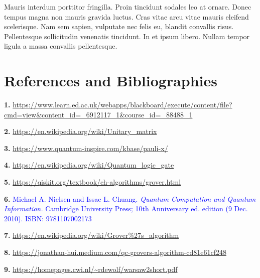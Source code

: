 \documentclass{article}
\begin{document}
Mauris interdum porttitor fringilla. Proin tincidunt sodales leo at ornare. Donec tempus magna non mauris gravida luctus. Cras vitae arcu vitae mauris eleifend scelerisque. Nam sem sapien, vulputate nec felis eu, blandit convallis risus. Pellentesque sollicitudin venenatis tincidunt. In et ipsum libero. Nullam tempor ligula a massa convallis pellentesque.



\section{References and Bibliographies}
\vspace{5mm}

\textbf{1.} \hypertarget{1}{\url{https://www.learn.ed.ac.uk/webapps/blackboard/execute/content/file?cmd=view&content_id=_6912117_1&course_id=_88488_1}}
\vspace{5mm}

\noindent
\textbf{2.} \hypertarget{2}{\url{https://en.wikipedia.org/wiki/Unitary_matrix}}
\vspace{5mm}

\noindent
\textbf{3.} \hypertarget{3}{\url{https://www.quantum-inspire.com/kbase/pauli-x/}}
\vspace{5mm}

\noindent
\textbf{4.} \hypertarget{4}{\url{https://en.wikipedia.org/wiki/Quantum_logic_gate}}
\vspace{5mm}

\noindent
\textbf{5.} \hypertarget{5}{\url{https://qiskit.org/textbook/ch-algorithms/grover.html}}
\vspace{5mm}

\noindent
\textbf{6.} \hypertarget{6}{\textcolor{blue}{Michael A. Nielsen and Issac L. Chuang. \textit{Quantum Computation and Quantum Information.} Cambridge University Press; 10th Anniversary ed. edition (9 Dec. 2010). ISBN: 9781107002173 }}
\vspace{5mm}

\noindent
\textbf{7.} \hypertarget{7}{\url{https://en.wikipedia.org/wiki/Grover\%27s_algorithm}}
\vspace{5mm}

\noindent
\textbf{8.} \hypertarget{8}{\url{https://jonathan-hui.medium.com/qc-grovers-algorithm-cd81e61cf248}}
\vspace{5mm}

\noindent
\textbf{9.} \hyperlink{9}{\url{https://homepages.cwi.nl/~rdewolf/warsaw2short.pdf}}
\end{document}
